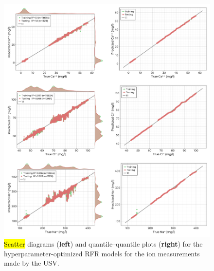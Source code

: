 \documentclass[remotesensing,article,accept,pdftex,moreauthors]{Definitions/mdpi}
\begin{document}
\begin{figure}[H]

\vspace{-0.15in}
\hspace{-6pt}\includegraphics[width=\columnwidth]{figures/results/fits/ions-fitres.png}
\vspace{-0.1in}
\caption{\hl{Scatter} %
 diagrams (\textbf{left}) and quantile--quantile plots (\textbf{right}) for the hyperparameter-optimized RFR models for the ion measurements made by the USV.\label{fig:ions-fit}}
\end{figure}  
\end{document}
